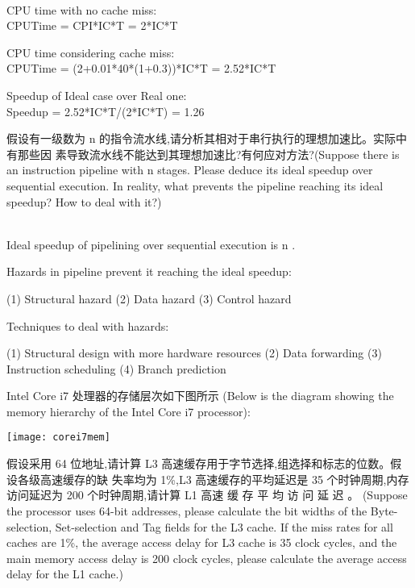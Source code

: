 \documentclass[a4paper, 12pt, addpoints, answers]{exam}
\begin{document}
\begin{questions}
\begin{solution}
{ } \\
CPU time with no cache miss:  \\
\centering CPUTime = CPI*IC*T = 2*IC*T   \\
\raggedright CPU time considering cache miss: \\
\centering CPUTime = (2+0.01*40*(1+0.3))*IC*T = 2.52*IC*T \\
\raggedright Speedup of Ideal case over Real one:  \\
\centering Speedup = 2.52*IC*T/(2*IC*T) = 1.26   \\
\end{solution}

\question[10]
假设有一级数为 n 的指令流水线,请分析其相对于串行执行的理想加速比。实际中有那些因
素导致流水线不能达到其理想加速比?有何应对方法?(Suppose there is an instruction pipeline with n stages.
Please deduce its ideal speedup over sequential execution. In reality, what prevents the pipeline reaching its ideal
speedup? How to deal with it?)

\begin{solution}
{ } \\
Ideal speedup of pipelining over sequential execution is n . \\
\raggedright Hazards in pipeline prevent it reaching the ideal speedup: \\
\raggedright (1) Structural hazard (2) Data hazard (3) Control hazard \\
\raggedright Techniques to deal with hazards:   \\
\raggedright (1) Structural design with more hardware resources (2) Data forwarding (3) Instruction scheduling (4) Branch prediction \\
\end{solution}

\question[10]
Intel Core i7 处理器的存储层次如下图所示 (Below is the diagram showing the memory hierarchy
of the Intel Core i7 processor):

\texttt{[image: corei7mem]}

假设采用 64 位地址,请计算 L3 高速缓存用于字节选择,组选择和标志的位数。假设各级高速缓存的缺
失率均为 1\%,L3 高速缓存的平均延迟是 35 个时钟周期,内存访问延迟为 200 个时钟周期,请计算 L1 高速
缓 存 平 均 访 问 延 迟 。 (Suppose the processor uses 64-bit addresses, please calculate the bit widths of the
Byte-selection, Set-selection and Tag fields for the L3 cache. If the miss rates for all caches are 1\%, the average
access delay for L3 cache is 35 clock cycles, and the main memory access delay is 200 clock cycles, please calculate
the average access delay for the L1 cache.)


\end{questions}
\end{document}
